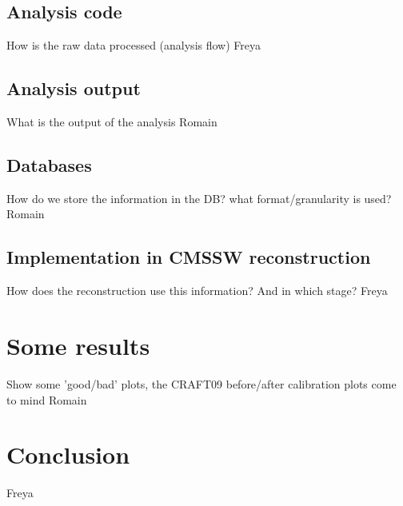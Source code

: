 \subsection{Analysis code}
How is the raw data processed (analysis flow)
Freya
\subsection{Analysis output}
What is the output of the analysis
Romain
\subsection{Databases}
How do we store the information in the DB? what format/granularity is used? 
Romain
\subsection{Implementation in CMSSW reconstruction}
How does the reconstruction use this information? And in which stage?
Freya
\section{Some results}
Show some 'good/bad' plots, the CRAFT09 before/after calibration plots come to mind
Romain
\section{Conclusion}
Freya

\clearpage
\appendix
